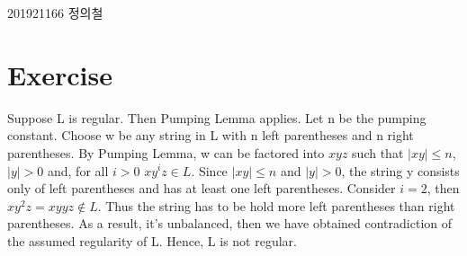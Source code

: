 \documentclass{article}
\begin{document}
\begin{flushright}
    201921166 정의철
\end{flushright}
\section{Exercise}
Suppose L is regular. Then Pumping Lemma applies.
Let n be the pumping constant. Choose w be any string in L with n left parentheses and n right parentheses.
By Pumping Lemma, w can be factored into $xyz$ such that $|xy| \leq n$, $|y| > 0$ and, for all $i > 0$ $xy^iz \in L$.
Since $|xy| \leq n$ and $|y| > 0$, the string y consists only of left parentheses and has at least one left parentheses.
Consider $i=2$, then $xy^2z = xyyz \notin L$.
Thus the string has to be hold more left parentheses than right parentheses.
As a result, it's unbalanced, then we have obtained contradiction of the assumed regularity of L.
Hence, L is not regular.
\end{document}
